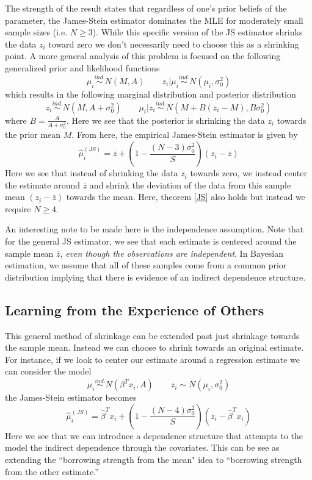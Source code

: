 \documentclass[11pt]{article}
\begin{document}
The strength of the result states that regardless of one's prior beliefs of the parameter, the James-Stein estimator dominates the MLE for moderately small sample sizes (i.e. $N\geq 3$). While this specific version of the JS estimator shrinks the data $z_i$ toward zero we don't necessarily need to choose this as a shrinking point. A more general analysis of this problem is focused on the following generalized prior and likelihood functions 
\begin{equation}
\mu_i\overset{ind.}{\sim}N(M,A)\quad\quad z_i|\mu_i\overset{ind.}{\sim}N(\mu_i, \sigma^2_0)
\end{equation} 
which results in the following marginal distribution and posterior distribution 
\begin{equation}
z_i\overset{ind.}{\sim}N(M,A+\sigma_0^2)\quad\quad \mu_i|z_i\overset{ind.}{\sim}N(M + B(z_i-M), B\sigma^2_0)
\end{equation} 
where $B = \frac{A}{A+\sigma_0^2}$. Here we see that the posterior is shrinking the data $z_i$ towards the prior mean $M$. From here, the empirical James-Stein estimator is given by 
\begin{equation}
\hat{\mu}_i^{(JS)} = \overline{z} + \left(1 - \frac{(N-3)\sigma_0^2}{S}\right)(z_i-\overline{z})
\end{equation}
Here we see that instead of shrinking the data $z_i$ towards zero, we instead center the estimate around $\overline{z}$ and shrink the deviation of the data from this sample mean $(z_i-\overline{z})$ towards the mean. 
Here, theorem \ref{JS} also holds but instead we require $N\geq 4$. 

An interesting note to be made here is the independence assumption. Note that for the general JS estimator, we see that each estimate is centered around the sample mean $\overline{z}$, \textit{even though the observations are independent}. In Bayesian estimation, we assume that all of these samples come from a common prior distribution implying that there is evidence of an indirect dependence structure. 

\subsection{Learning from the Experience of Others}

This general method of shrinkage can be extended past just shrinkage towards the sample mean. Instead we can choose to shrink towards an original estimate. For instance, if we look to center our estimate around a regression estimate we can consider the model 
\begin{equation}
\mu_i\overset{ind.}{\sim}N(\beta^Tx_i, A)\quad\quad z_i\sim N(\mu_i,\sigma_0^2)
\end{equation} 
the James-Stein estimator becomes 
\begin{equation}
\hat{\mu}_i^{(JS)} = \hat{\beta}^Tx_i + \left(1 - \frac{(N-4)\sigma_0^2}{S}\right)(z_i - \hat{\beta}^Tx_i)
\end{equation}
Here we see that we can introduce a dependence structure that attempts to the model the indirect dependence through the covariates. This can be see as extending the ``borrowing strength from the mean" idea to ``borrowing strength from the other estimate.''  
\end{document}
